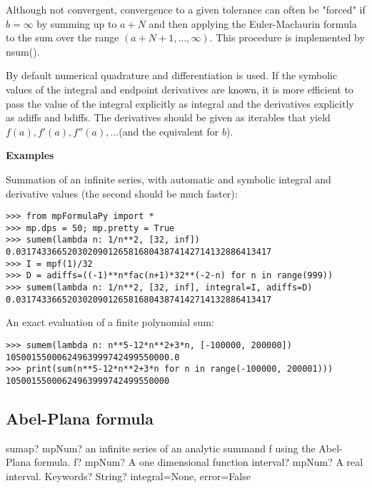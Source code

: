 \vpara
Although not convergent, convergence to a given tolerance can often be "forced" if $b=\infty$ by summing up to $a+N$ and then applying the Euler-Maclaurin formula to the sum over the range $(a+N+1,\ldots,\infty)$. This procedure is implemented by nsum().

\vpara
By default numerical quadrature and differentiation is used. If the symbolic values of the integral and endpoint derivatives are known, it is more efficient to pass the value of the integral explicitly as integral and the derivatives explicitly as adiffs and bdiffs.
The derivatives should be given as iterables that yield $f(a),f'(a),f''(a),\ldots$(and the equivalent for $b$).

\vpara
\textbf{Examples}

Summation of an infinite series, with automatic and symbolic integral and derivative values (the second should be much faster):

\begin{lstlisting}
>>> from mpFormulaPy import *
>>> mp.dps = 50; mp.pretty = True
>>> sumem(lambda n: 1/n**2, [32, inf])
0.03174336652030209012658168043874142714132886413417
>>> I = mpf(1)/32
>>> D = adiffs=((-1)**n*fac(n+1)*32**(-2-n) for n in range(999))
>>> sumem(lambda n: 1/n**2, [32, inf], integral=I, adiffs=D)
0.03174336652030209012658168043874142714132886413417
\end{lstlisting}

An exact evaluation of a finite polynomial sum:

\begin{lstlisting}
>>> sumem(lambda n: n**5-12*n**2+3*n, [-100000, 200000])
10500155000624963999742499550000.0
>>> print(sum(n**5-12*n**2+3*n for n in range(-100000, 200001)))
10500155000624963999742499550000
\end{lstlisting}



\subsection{Abel-Plana formula}

\begin{mpFunctionsExtract}
	\mpFunctionThree
	{sumap? mpNum? an infinite series of an analytic summand f using the Abel-Plana formula.}
	{f? mpNum? A one dimensional function}
	{interval? mpNum? A real interval.}	
	{Keywords? String?  integral=None, error=False}	
\end{mpFunctionsExtract}


